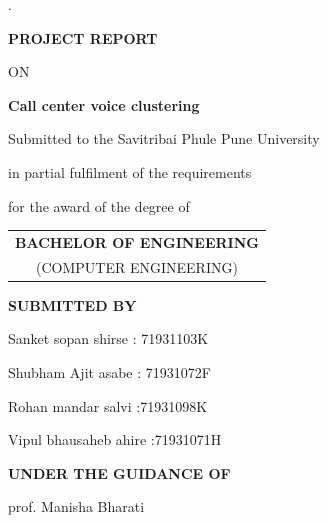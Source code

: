 \begin{titlepage}

\pagestyle{fancy}
\fancypage.{%
  \setlength{\fboxsep}{0pt}%
  \setlength{\shadowsize}{0pt}%
  \shadowbox}{}
\linespread{1}
\begin{center}

\begin{center}\textbf{{ PROJECT  REPORT}}\end{center}
\begin{center} ON\end{center}
\begin{center}\textbf{{ Call center voice clustering
}}\end{center}
\vspace{.1in}
\begin{center} {{\large Submitted to the Savitribai Phule Pune University}}\end{center}
\begin{center} {{\large in partial fulfilment of the requirements}}\end{center}
\begin{center}{{\large for the award of the degree of}}\end{center}

\begin{table}[h!]
\centering
\begin{tabular}{c}
\textbf{BACHELOR OF ENGINEERING}  \\
 {\footnotesize (COMPUTER ENGINEERING)}  \\ 
\end{tabular} 
\end{table}

\begin{center}{ \textbf{SUBMITTED BY}}\end{center}
\vspace{-.6cm}
\begin{center}{ Sanket sopan  shirse   :  71931103K
 }\end{center}
\vspace{-.6cm}
\begin{center}{ Shubham  Ajit asabe  : 71931072F  }\end{center}
\vspace{-.6cm}
\begin{center}{ Rohan mandar salvi  :71931098K  }\end{center}
\vspace{-.6cm}
\begin{center}{ Vipul bhausaheb ahire  :71931071H }\end{center}
\vspace{.10in}
\begin{center}{ \textbf{UNDER THE GUIDANCE OF}}\end{center}
\vspace{-.4cm}
\begin{center}{prof. Manisha Bharati}\end{center}
\vspace{.1in}


\end{center}
\end{titlepage}
